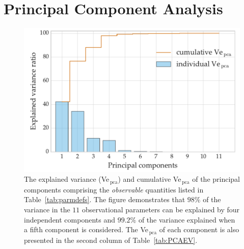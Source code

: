 \section{Principal Component Analysis}
\label{sec:PCA}
\begin{figure}
    \centering
    \includegraphics[width=0.8\linewidth]{PCA_CUMUL3.pdf}
    \caption[Explained variance of principal components]{{The explained variance (Ve$_{\,\text{pca}}$) and cumulative Ve$_{\,\text{pca}}$ of the principal components comprising the \emph{observable} quantities listed in Table~\ref{tab:parmdefs}. The figure demonstrates that  $98\%$ of the variance in the $11$ observational parameters can be explained by four independent components and $99.2\%$ of the variance explained when a fifth component is considered. The Ve$_{\,\text{pca}}$ of each component is  also presented in the second column of Table~\ref{tab:PCAEV}. }}
    \label{fig:GCA-pca}
\end{figure}


